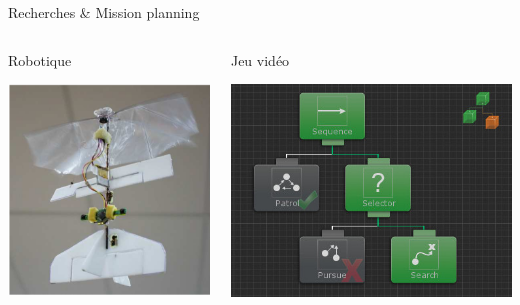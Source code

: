 \documentclass[presentation]{beamer}
\begin{document}
\begin{frame}[label=sec-2-0-4]{Recherches \& Mission planning}
\begin{columns}
\begin{column}{0.5\textwidth}

\begin{center}
Robotique
\end{center}

\includegraphics[width=.9\linewidth]{./img/Drone.png}
\end{column}

\begin{column}{0.5\textwidth}

\begin{center}
Jeu vidéo
\end{center}

\includegraphics[width=.9\linewidth]{./img/Unity.jpg}
\end{column}
\end{columns}
\end{frame}
\end{document}
